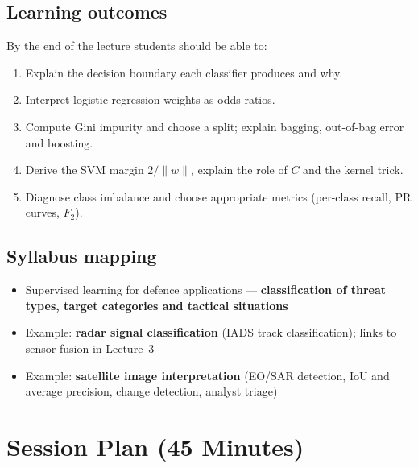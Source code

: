 \documentclass[11pt]{article}
\begin{document}
\subsection*{Learning outcomes}By the end of the lecture students should be able to:\begin{enumerate}\item Explain the decision boundary each classifier produces and why.\item Interpret logistic-regression weights as odds ratios.\item Compute Gini impurity and choose a split; explain bagging, out-of-bag error and boosting.\item Derive the SVM margin $2/\|w\|$, explain the role of $C$ and the kernel trick.\item Diagnose class imbalance and choose appropriate metrics (per-class recall, PR curves, $F_2$).\end{enumerate}

\subsection*{Syllabus mapping}\begin{itemize}\item Supervised learning for defence applications --- \textbf{classification of threat types, target categories and tactical situations}\item Example: \textbf{radar signal classification} (IADS track classification); links to sensor fusion in Lecture~3\item Example: \textbf{satellite image interpretation} (EO/SAR detection, IoU and average precision, change detection, analyst triage)\end{itemize}

\section{Session Plan (45 Minutes)}
\end{document}

